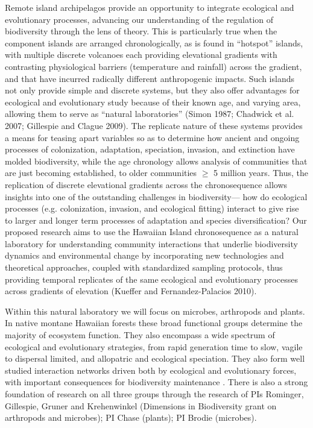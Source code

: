 \documentclass[11pt]{article}
\begin{document}
Remote island archipelagos provide an opportunity to integrate ecological and evolutionary processes, advancing our understanding of the regulation of biodiversity through the lens of theory.  This is particularly true when the component islands are arranged chronologically, as is found in ``hotspot'' islands, with multiple discrete volcanoes each providing elevational gradients with contrasting physiological barriers (temperature and rainfall) across the gradient, and that have incurred radically different anthropogenic impacts. Such islands not only provide simple and discrete systems, but they also offer advantages for ecological and evolutionary study because of their known age, and varying area, allowing them to serve as ``natural laboratories'' (Simon 1987; Chadwick et al. 2007; Gillespie and Clague 2009). The replicate nature of these systems provides a means for teasing apart variables so as to determine how ancient and ongoing processes of colonization, adaptation, speciation, invasion, and extinction have molded biodiversity, while the age chronology allows analysis of communities that are just becoming established, to older communities $\geq$ 5 million years. Thus, the replication of discrete elevational gradients across the chronosequence allows insights into one of the outstanding challenges in biodiversity— how do ecological processes (e.g. colonization, invasion, and ecological fitting) interact to give rise to larger and longer term processes of adaptation and species diversification? Our proposed research aims to use the Hawaiian Island chronosequence as a natural laboratory for understanding community interactions that underlie biodiversity dynamics and environmental change by incorporating new technologies and theoretical approaches, coupled with standardized sampling protocols, thus providing temporal replicates of the same ecological and evolutionary processes across gradients of elevation (Kueffer and Fernandez-Palacios 2010).

Within this natural laboratory we will focus on microbes, arthropods and plants.  In native montane Hawaiian forests these broad functional groups determine the majority of ecosystem function. They also encompass a wide spectrum of ecological and evolutionary strategies, from rapid generation time to slow, vagile to dispersal limited, and allopatric and ecological speciation.  They also form well studied interaction networks driven both by ecological and evolutionary forces, with important consequences for biodiversity maintenance \citep{bascompte}.  There is also a strong foundation of research on all three groups through the research of PIs Rominger, Gillespie, Gruner and Krehenwinkel (Dimensions in Biodiversity grant on arthropods and microbes); PI Chase (plants); PI Brodie (microbes).
\end{document}
